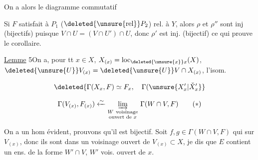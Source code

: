 
On a alors le diagramme commutatif


Si $F$ satisfait à $P_1$ ($\deleted{\unsure{\mathrm{rel}}}P_2$) rel. à $Y$, alors $\rho$ et $\rho''$ sont  inj (bijectifs) puisque $V\cap U=(V\cap U')\cap U$, donc  $\rho'$ est inj. (bijectif) ce qui prouve le corollaire.


\uline{Lemme} 5\quad On a, pour tt $x\in X$,    $X_{(x)}=\mathrm{loc}_{\deleted{\unsure{x}}x}(X)$,  $\deleted{\unsure{U}}V_{(x)}=\deleted{\unsure{U}}V\cap X_{(x)}$, l'isom. 

\[
\deleted{\Gamma(X_x,F)\simeq F_x,\quad \Gamma(\unsure{X'_x|\check X'_x}}
\]

\[
\Gamma(V_{(x)},F_{(x)})\xleftarrow{\sim}
\underset{\substack{W\ \text{voisinage}\\\text{ouvert de }x}}{\varinjlim}\ \Gamma(W\cap V,F)
\tag*{$(*)$}
\]

On a un hom évident, prouvons qu'il est bijectif. Soit $f,g\in\Gamma(W\cap V,F)$ qui    sur $V_{(x)}$, donc ils sont  dans un voisinage ouvert  de $V_{(x)}\subset X$,  je dis que $E$ contient un ens. de la forme $W'\cap V$, $W'$ vois. ouvert de $x$.

